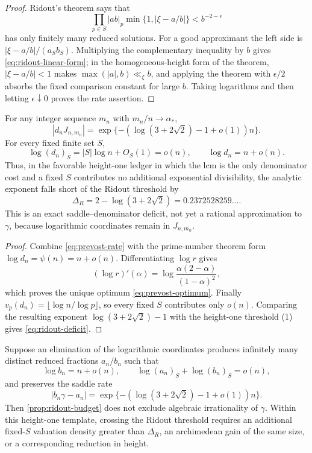 \begin{proof}
Ridout's theorem \cite{Ridout1958} says that
\[
 \prod_{p\in S}|ab|_p
 \min\{1,|\xi-a/b|\}<b^{-2-\epsilon}
\]
has only finitely many reduced solutions.  For a good approximant the left
side is \(|\xi-a/b|/(a_Sb_S)\).  Multiplying the complementary inequality
by \(b\) gives \eqref{eq:ridout-linear-form}; in the homogeneous-height
form of the theorem, \(|\xi-a/b|<1\) makes
\(\max(|a|,b)\ll_\xi b\), and applying the theorem with
\(\epsilon/2\) absorbs the fixed comparison constant for large \(b\).
Taking logarithms and then letting \(\epsilon\downarrow0\) proves the rate
assertion.
\end{proof}

\begin{theorem}
\label{thm:prevost-ridout-deficit}
For any integer sequence \(m_n\) with \(m_n/n\to\alpha_*\),
\[
 |d_nJ_{n,m_n}|=
 \exp\{-(\log(3+2\sqrt2)-1+o(1))n\}.
\]
For every fixed finite set \(S\),
\[
 \log(d_n)_S=|S|\log n+O_S(1)=o(n),
 \qquad
 \log d_n=n+o(n).
\]
Thus, in the favorable height-one ledger in which the lcm is the only
denominator cost and a fixed \(S\) contributes no additional exponential
divisibility, the analytic exponent falls short of the Ridout threshold by
\begin{equation}\label{eq:ridout-deficit}
 \boxed{\displaystyle
 \Delta_R=2-\log(3+2\sqrt2)
 =0.2372528259\ldots.}
\end{equation}
This is an exact saddle--denominator deficit, not yet a rational
approximation to \(\gamma\), because logarithmic coordinates remain in
\(J_{n,m_n}\).
\end{theorem}

\begin{proof}
Combine \eqref{eq:prevost-rate} with the prime-number theorem form
\(\log d_n=\psi(n)=n+o(n)\).  Differentiating \(\log r\) gives
\[
 (\log r)'(\alpha)
 =\log\frac{\alpha(2-\alpha)}{(1-\alpha)^2},
\]
which proves the unique optimum \eqref{eq:prevost-optimum}.  Finally
\(v_p(d_n)=\lfloor\log n/\log p\rfloor\), so every fixed \(S\) contributes
only \(o(n)\).  Comparing the resulting exponent
\(\log(3+2\sqrt2)-1\) with the height-one threshold (1) gives
\eqref{eq:ridout-deficit}.
\end{proof}

\begin{corollary}
Suppose an elimination of the logarithmic coordinates produces infinitely
many distinct reduced fractions \(a_n/b_n\) such that
\[
 \log b_n=n+o(n),\qquad
 \log(a_n)_S+\log(b_n)_S=o(n),
\]
and preserves the saddle rate
\[
 |b_n\gamma-a_n|
 =\exp\{-(\log(3+2\sqrt2)-1+o(1))n\}.
\]
Then \cref{prop:ridout-budget} does not exclude algebraic irrationality of
\(\gamma\).  Within this height-one template, crossing the Ridout threshold
requires an additional fixed-\(S\) valuation density greater than
\(\Delta_R\), an archimedean gain of the same size, or a corresponding
reduction in height.
\end{corollary}


